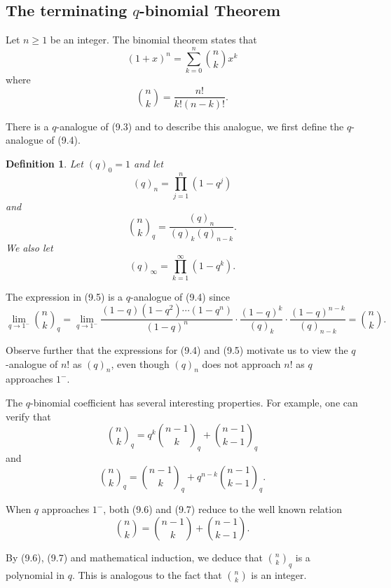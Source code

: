 \documentclass{article}
\newtheorem{definition}[theorem]{Definition}
\begin{document}
\subsection{The terminating $q$-binomial Theorem}

Let $n \geq 1$ be an integer. The binomial theorem states that
\begin{equation}
(1 + x)^n = \sum_{k=0}^{n} \binom{n}{k} x^k
\tag{9.3}
\end{equation}
where
\begin{equation}
\binom{n}{k} = \frac{n!}{k!(n-k)!}.
\tag{9.4}
\end{equation}

There is a $q$-analogue of (9.3) and to describe this analogue, we first define the
$q$-analogue of (9.4).

\begin{definition}
Let $(q)_0 = 1$ and let
\[
(q)_n = \prod_{j=1}^{n} (1 - q^j)
\]
and
\begin{equation}
\binom{n}{k}_q = \frac{(q)_n}{(q)_k (q)_{n-k}}.
\tag{9.5}
\end{equation}
We also let
\[
(q)_\infty = \prod_{k=1}^{\infty} (1 - q^k).
\]
\end{definition}

The expression in (9.5) is a $q$-analogue of (9.4) since
\[
\lim_{q \to 1^-} \binom{n}{k}_q = \lim_{q \to 1^-} \frac{(1-q)(1-q^2)\cdots(1-q^n)}{(1-q)^n} \cdot \frac{(1-q)^k}{(q)_k} \cdot \frac{(1-q)^{n-k}}{(q)_{n-k}} = \binom{n}{k}.
\]

Observe further that the expressions for (9.4) and (9.5) motivate us to view the
$q$-analogue of $n!$ as $(q)_n$, even though $(q)_n$ does not approach $n!$ as $q$ approaches
$1^-$.

The $q$-binomial coefficient has several interesting properties. For example, one
can verify that
\begin{equation}
\binom{n}{k}_q = q^k \binom{n-1}{k}_q + \binom{n-1}{k-1}_q
\tag{9.6}
\end{equation}
and
\begin{equation}
\binom{n}{k}_q = \binom{n-1}{k}_q + q^{n-k} \binom{n-1}{k-1}_q.
\tag{9.7}
\end{equation}

When $q$ approaches $1^-$, both (9.6) and (9.7) reduce to the well known relation
\[
\binom{n}{k} = \binom{n-1}{k} + \binom{n-1}{k-1}.
\]

By (9.6), (9.7) and mathematical induction, we deduce that $\binom{n}{k}_q$ is a polynomial
in $q$. This is analogous to the fact that $\binom{n}{k}$ is an integer.
\end{document}

